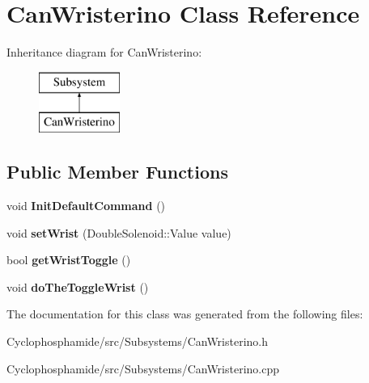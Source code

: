 \hypertarget{class_can_wristerino}{}\section{Can\+Wristerino Class Reference}
\label{class_can_wristerino}
Inheritance diagram for Can\+Wristerino\+:\begin{figure}[H]
\begin{center}
\leavevmode
\includegraphics[height=2.000000cm]{class_can_wristerino}
\end{center}
\end{figure}
\subsection*{Public Member Functions}
\begin{DoxyCompactItemize}
\item 
\hypertarget{class_can_wristerino_a59e4a4005b747d4c3a7965158f84ba0b}{}void {\bfseries Init\+Default\+Command} ()\label{class_can_wristerino_a59e4a4005b747d4c3a7965158f84ba0b}

\item 
\hypertarget{class_can_wristerino_aae53b74938aa3c606d2aa07f8da93b86}{}void {\bfseries set\+Wrist} (Double\+Solenoid\+::\+Value value)\label{class_can_wristerino_aae53b74938aa3c606d2aa07f8da93b86}

\item 
\hypertarget{class_can_wristerino_a6555d37a0301532854a85c0a4419ee5e}{}bool {\bfseries get\+Wrist\+Toggle} ()\label{class_can_wristerino_a6555d37a0301532854a85c0a4419ee5e}

\item 
\hypertarget{class_can_wristerino_a7a7aa32ed931d705aedecfda346c77c0}{}void {\bfseries do\+The\+Toggle\+Wrist} ()\label{class_can_wristerino_a7a7aa32ed931d705aedecfda346c77c0}

\end{DoxyCompactItemize}


The documentation for this class was generated from the following files\+:\begin{DoxyCompactItemize}
\item 
Cyclophosphamide/src/\+Subsystems/Can\+Wristerino.\+h\item 
Cyclophosphamide/src/\+Subsystems/Can\+Wristerino.\+cpp\end{DoxyCompactItemize}
